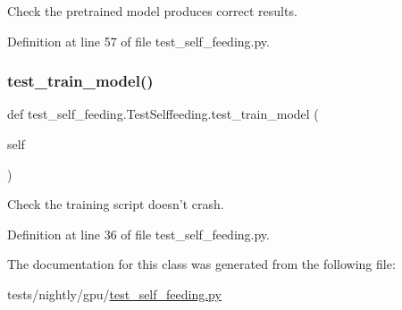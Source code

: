 \begin{DoxyVerb}Check the pretrained model produces correct results.
\end{DoxyVerb}
 

Definition at line 57 of file test\+\_\+self\+\_\+feeding.\+py.

\mbox{\label{classtest__self__feeding_1_1TestSelffeeding_a98171dd8471ea27cf898db407bae5ef8}} 
\subsubsection{\texorpdfstring{test\+\_\+train\+\_\+model()}{test\_train\_model()}}
{\footnotesize\ttfamily def test\+\_\+self\+\_\+feeding.\+Test\+Selffeeding.\+test\+\_\+train\+\_\+model (\begin{DoxyParamCaption}\item[{}]{self }\end{DoxyParamCaption})}

\begin{DoxyVerb}Check the training script doesn't crash.
\end{DoxyVerb}
 

Definition at line 36 of file test\+\_\+self\+\_\+feeding.\+py.



The documentation for this class was generated from the following file\+:\begin{DoxyCompactItemize}
\item 
tests/nightly/gpu/\hyperlink{test__self__feeding_8py}{test\+\_\+self\+\_\+feeding.\+py}\end{DoxyCompactItemize}

